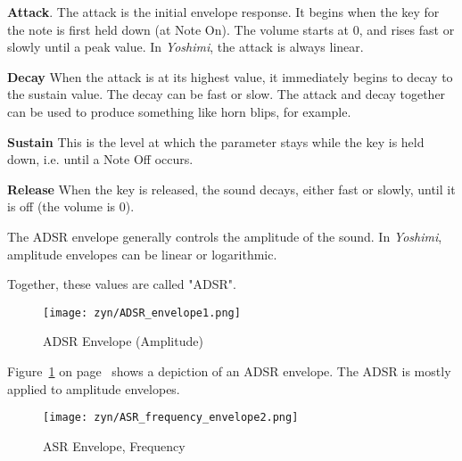    \begin{enumber}
      \item \textbf{Attack}.
         \label{ref:attack}
         The attack is the initial envelope response. 
         It begins when the key for the note is first held down
         (at Note On).
         The volume starts at 0, and rises fast or slowly until a peak value.
         In \textsl{Yoshimi}, the attack is always linear.
      \item \textbf{Decay}
         \label{ref:decay}
         When the attack is at its highest value, it immediately begins
         to decay to the sustain value.  The decay can be fast or slow.
         The attack and decay together can be used to produce something like
         horn blips, for example.
      \item \textbf{Sustain}
         \label{ref:sustain}
         This is the level at which the parameter stays while the key is
         held down, i.e. until a Note Off occurs.
      \item \textbf{Release}
         \label{ref:release}
         When the key is released, the sound decays, either fast or slowly,
         until it is off (the volume is 0).
   \end{enumber}

   The ADSR envelope generally controls the amplitude of the sound.
   In \textsl{Yoshimi},
   amplitude envelopes can be linear or logarithmic.

   Together, these values are called "ADSR".  

\begin{figure}[H]
   \centering 
   \texttt{[image: zyn/ADSR\_envelope1.png]}
   \caption{ADSR Envelope (Amplitude)}
   \label{fig:adsr_envelope_depiction}
\end{figure}

   Figure~\ref{fig:adsr_envelope_depiction} on
   page~\pageref{fig:adsr_envelope_depiction}
   shows a depiction of an ADSR envelope.
   The ADSR is mostly applied to amplitude envelopes.

\begin{figure}[H]
   \centering 
   \texttt{[image: zyn/ASR\_frequency\_envelope2.png]}
   \caption{ASR Envelope, Frequency}
   \label{fig:asr_envelope_depiction}
\end{figure}

